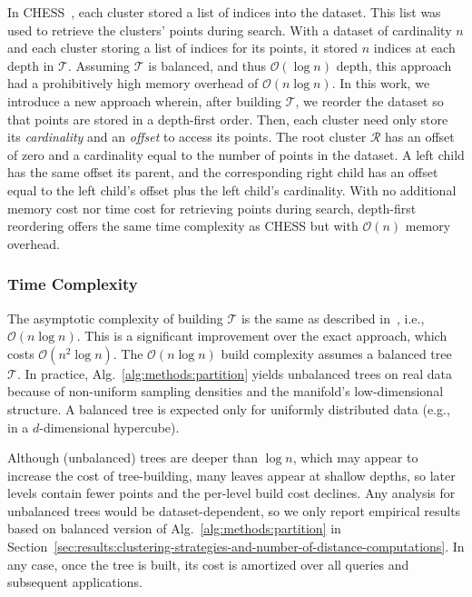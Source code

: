 In CHESS~\cite{ishaq2019clustered}, each cluster stored a list of indices into the dataset.
This list was used to retrieve the clusters' points during search.
With a dataset of cardinality $n$ and each cluster storing a list of indices for its points, it stored $n$ indices at each depth in $\mathcal{T}$.
Assuming $\mathcal{T}$ is balanced, and thus $\mathcal{O}(\log n)$ depth, this approach had a prohibitively high memory overhead of $\mathcal{O}(n \log n)$.
In this work, we introduce a new approach wherein, after building $\mathcal{T}$, we reorder the dataset so that points are stored in a depth-first order.
Then, each cluster need only store its \textit{cardinality} and an \textit{offset} to access its points.
The root cluster $\mathcal{R}$ has an offset of zero and a cardinality equal to the number of points in the dataset.
A left child has the same offset its parent, and the corresponding right child has an offset equal to the left child's offset plus the left child's cardinality.
With no additional memory cost nor time cost for retrieving points during search, depth-first reordering offers the same time complexity as CHESS but with $\mathcal{O}(n)$ memory overhead.


\subsubsection{Time Complexity}
\label{sec:methods:clustering:time-complexity}

The asymptotic complexity of building $\mathcal{T}$ is the same as described in~\cite{ishaq2019clustered}, i.e., $\mathcal{O}(n \log n)$.
This is a significant improvement over the exact approach, which costs $\mathcal{O}(n^2 \log n)$.
The $\mathcal{O}(n\log n)$ build complexity assumes a balanced tree $\mathcal{T}$.
In practice, Alg.~\ref{alg:methods:partition} yields unbalanced trees on real data because of non-uniform sampling densities and the manifold's low-dimensional structure.
A balanced tree is expected only for uniformly distributed data (e.g., in a $d$-dimensional hypercube).

Although (unbalanced) trees are deeper than $\log n$, which may appear to increase the cost of tree-building, many leaves appear at shallow depths, so later levels contain fewer points and the per-level build cost declines.
Any analysis for unbalanced trees would be dataset-dependent, so we only report empirical results based on balanced version of Alg.~\ref{alg:methods:partition} in Section~\ref{sec:results:clustering-strategies-and-number-of-distance-computations}.
In any case, once the tree is built, its cost is amortized over all queries and subsequent applications.


